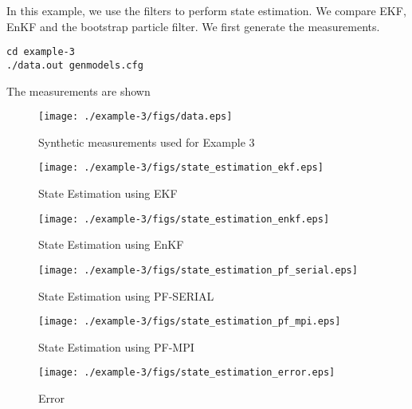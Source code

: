 \documentclass{article}
\begin{document}
In this example, we use the filters to perform state estimation. We compare EKF, EnKF and the bootstrap particle filter.
We first generate the measurements.
\begin{lstlisting}
cd example-3
./data.out genmodels.cfg
\end{lstlisting}
The measurements are shown 
\begin{figure}
\centering
\texttt{[image: ./example-3/figs/data.eps]}
\caption{Synthetic measurements used for Example 3}
\end{figure}

\begin{figure}
\centering
\texttt{[image: ./example-3/figs/state\_estimation\_ekf.eps]}
\caption{State Estimation using EKF}
\end{figure}

\begin{figure}
\centering
\texttt{[image: ./example-3/figs/state\_estimation\_enkf.eps]}
\caption{State Estimation using EnKF}
\end{figure}

\begin{figure}
\centering
\texttt{[image: ./example-3/figs/state\_estimation\_pf\_serial.eps]}
\caption{State Estimation using PF-SERIAL}
\end{figure}

\begin{figure}
\centering
\texttt{[image: ./example-3/figs/state\_estimation\_pf\_mpi.eps]}
\caption{State Estimation using PF-MPI}
\end{figure}

\begin{figure}
\centering
\texttt{[image: ./example-3/figs/state\_estimation\_error.eps]}
\caption{Error}
\end{figure}
\end{document}
